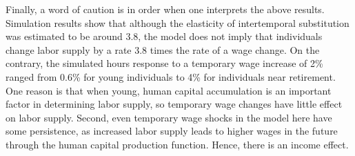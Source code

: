 \documentclass{article}
\begin{document}
 Finally, a word of caution is in order when one interprets the above results. Simulation results show that although the elasticity of intertemporal substitution was estimated to be around 3.8, the model does not imply that individuals change labor supply by a rate 3.8 times the rate of a wage change. On the contrary, the simulated hours response to a temporary wage increase of 2\% ranged from 0.6\% for young individuals to 4\% for individuals near retirement. One reason is that when young, human capital accumulation is an important factor in determining labor supply, so temporary wage changes have little effect on labor supply. Second, even temporary wage shocks in the model here have some persistence, as increased labor supply leads to higher wages in the future through the human capital production function. Hence, there is an income effect.
\end{document}
